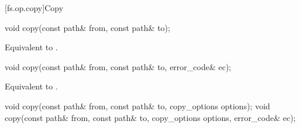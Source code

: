 [fs.op.copy]{Copy}

%
\begin{itemdecl}
void copy(const path& from, const path& to);
\end{itemdecl}

\begin{itemdescr}
\pnum
\effects
Equivalent to
.
\end{itemdescr}

%
\begin{itemdecl}
void copy(const path& from, const path& to, error_code& ec);
\end{itemdecl}

\begin{itemdescr}
\pnum
\effects
Equivalent to
.
\end{itemdescr}

%
\begin{itemdecl}
void copy(const path& from, const path& to, copy_options options);
void copy(const path& from, const path& to, copy_options options,
          error_code& ec);
\end{itemdecl}

